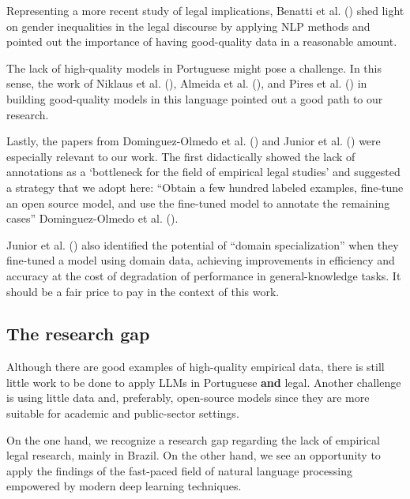\documentclass[
  12pt,
]{article}
\begin{document}
Representing a more recent study of legal implications, Benatti et al.
() shed light on gender
inequalities in the legal discourse by applying NLP methods and pointed
out the importance of having good-quality data in a reasonable amount.

The lack of high-quality models in Portuguese might pose a challenge. In
this sense, the work of Niklaus et al.
(), Almeida et al.
(), and Pires et al.
() in building good-quality models
in this language pointed out a good path to our research.

Lastly, the papers from Dominguez-Olmedo et al.
() and Junior et al.
() were especially relevant to our
work. The first didactically showed the lack of annotations as a
`bottleneck for the field of empirical legal studies' and suggested a
strategy that we adopt here: ``Obtain a few hundred labeled examples,
fine-tune an open source model, and use the fine-tuned model to annotate
the remaining cases'' Dominguez-Olmedo et al.
().

Junior et al. () also identified
the potential of ``domain specialization'' when they fine-tuned a model
using domain data, achieving improvements in efficiency and accuracy at
the cost of degradation of performance in general-knowledge tasks. It
should be a fair price to pay in the context of this work.

\subsection{The research gap}\label{the-research-gap}

Although there are good examples of high-quality empirical data, there
is still little work to be done to apply LLMs in Portuguese \textbf{and}
legal. Another challenge is using little data and, preferably,
open-source models since they are more suitable for academic and
public-sector settings.

On the one hand, we recognize a research gap regarding the lack of
empirical legal research, mainly in Brazil. On the other hand, we see an
opportunity to apply the findings of the fast-paced field of natural
language processing empowered by modern deep learning techniques.
\end{document}
